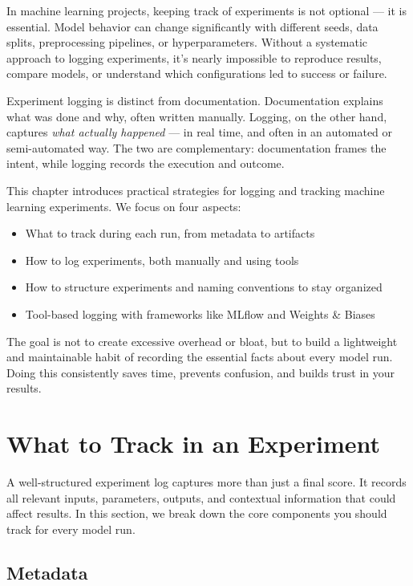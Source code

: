 \documentclass[12pt,openany]{book}
\begin{document}
In machine learning projects, keeping track of experiments is not optional — it is essential. Model behavior can change significantly with different seeds, data splits, preprocessing pipelines, or hyperparameters. Without a systematic approach to logging experiments, it's nearly impossible to reproduce results, compare models, or understand which configurations led to success or failure. \newline

Experiment logging is distinct from documentation. Documentation explains what was done and why, often written manually. Logging, on the other hand, captures \emph{what actually happened} — in real time, and often in an automated or semi-automated way. The two are complementary: documentation frames the intent, while logging records the execution and outcome.

This chapter introduces practical strategies for logging and tracking machine learning experiments. We focus on four aspects:

\begin{itemize}
    \item What to track during each run, from metadata to artifacts
    \item How to log experiments, both manually and using tools
    \item How to structure experiments and naming conventions to stay organized
    \item Tool-based logging with frameworks like MLflow and Weights \& Biases
\end{itemize}

The goal is not to create excessive overhead or bloat, but to build a lightweight and maintainable habit of recording the essential facts about every model run. Doing this consistently saves time, prevents confusion, and builds trust in your results.



\section{What to Track in an Experiment}

A well-structured experiment log captures more than just a final score. It records all relevant inputs, parameters, outputs, and contextual information that could affect results. In this section, we break down the core components you should track for every model run.

\subsection{Metadata}
\end{document}
